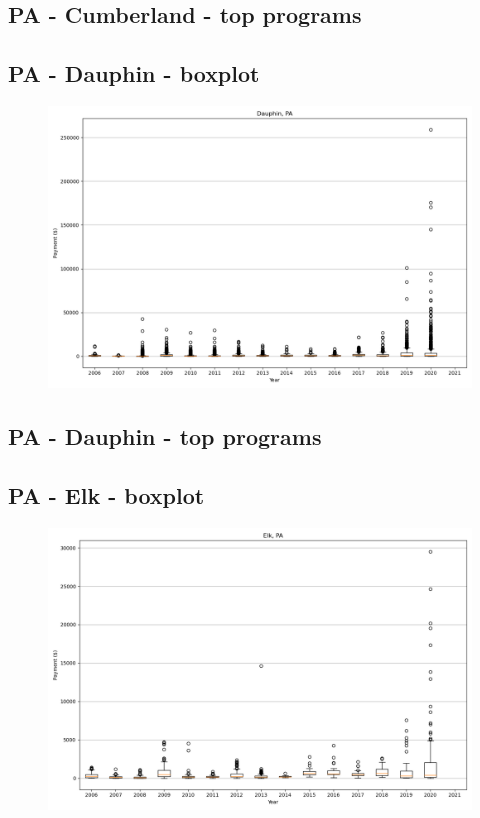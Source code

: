 \subsection*{PA - Cumberland - top programs}

\newpage
\subsection*{PA - Dauphin - boxplot}
\begin{figure}[h]
\centering
\includegraphics[width=7in]{../output/boxplots/counties/Dauphin-PA_boxplot.png}
\end{figure}


\subsection*{PA - Dauphin - top programs}

\newpage
\subsection*{PA - Elk - boxplot}
\begin{figure}[h]
\centering
\includegraphics[width=7in]{../output/boxplots/counties/Elk-PA_boxplot.png}
\end{figure}


